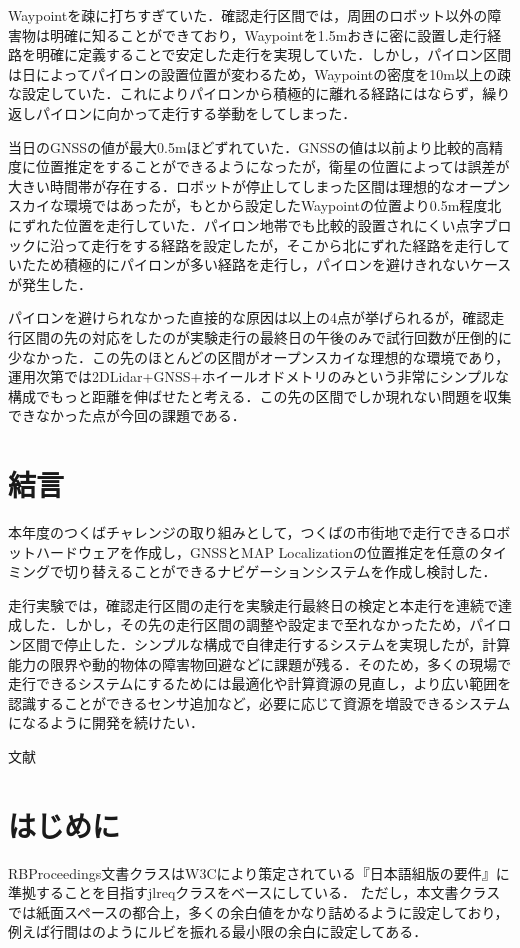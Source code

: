 \documentclass[platex,dvipdfmx]{rbproceedings}
\newcommand{\pkg}[1]{\textsf{#1}}
\begin{document}
Waypointを疎に打ちすぎていた．確認走行区間では，周囲のロボット以外の障害物は明確に知ることができており，Waypointを1.5mおきに密に設置し走行経路を明確に定義することで安定した走行を実現していた．しかし，パイロン区間は日によってパイロンの設置位置が変わるため，Waypointの密度を10m以上の疎な設定していた．これによりパイロンから積極的に離れる経路にはならず，繰り返しパイロンに向かって走行する挙動をしてしまった．

当日のGNSSの値が最大0.5mほどずれていた．GNSSの値は以前より比較的高精度に位置推定をすることができるようになったが，衛星の位置によっては誤差が大きい時間帯が存在する．ロボットが停止してしまった区間は理想的なオープンスカイな環境ではあったが，もとから設定したWaypointの位置より0.5m程度北にずれた位置を走行していた．パイロン地帯でも比較的設置されにくい点字ブロックに沿って走行をする経路を設定したが，そこから北にずれた経路を走行していたため積極的にパイロンが多い経路を走行し，パイロンを避けきれないケースが発生した．

パイロンを避けられなかった直接的な原因は以上の4点が挙げられるが，確認走行区間の先の対応をしたのが実験走行の最終日の午後のみで試行回数が圧倒的に少なかった．この先のほとんどの区間がオープンスカイな理想的な環境であり，運用次第では2DLidar+GNSS+ホイールオドメトリのみという非常にシンプルな構成でもっと距離を伸ばせたと考える．この先の区間でしか現れない問題を収集できなかった点が今回の課題である．

\section{結言}
本年度のつくばチャレンジの取り組みとして，つくばの市街地で走行できるロボットハードウェアを作成し，GNSSとMAP Localizationの位置推定を任意のタイミングで切り替えることができるナビゲーションシステムを作成し検討した．

走行実験では，確認走行区間の走行を実験走行最終日の検定と本走行を連続で達成した．しかし，その先の走行区間の調整や設定まで至れなかったため，パイロン区間で停止した．シンプルな構成で自律走行するシステムを実現したが，計算能力の限界や動的物体の障害物回避などに課題が残る．そのため，多くの現場で走行できるシステムにするためには最適化や計算資源の見直し，より広い範囲を認識することができるセンサ追加など，必要に応じて資源を増設できるシステムになるように開発を続けたい．

文献



\section{はじめに}
\pkg{RBProceedings}文書クラスはW3Cにより策定されている『日本語組版の要件』\cite{JLREQ}に準拠することを目指す\pkg{jlreq}クラスをベースにしている．
ただし，本文書クラスでは紙面スペースの都合上，多くの余白値をかなり詰めるように設定しており，例えば行間はのようにルビを振れる最小限の余白に設定してある．
\end{document}
